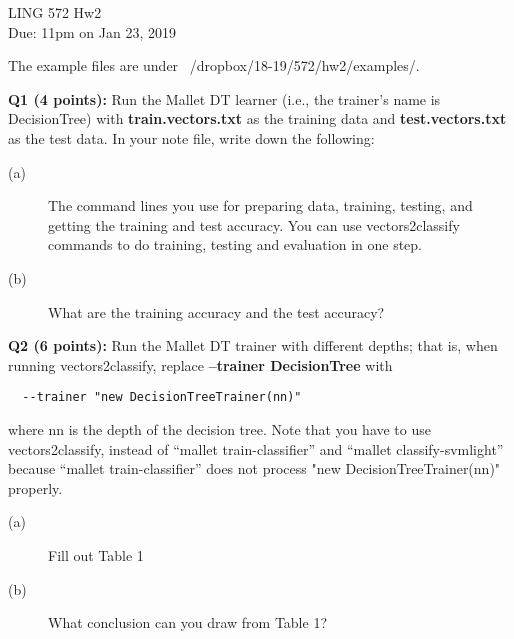 \documentclass[11pt]{article}
\begin{document}
\begin{center}
\LARGE
LING 572 Hw2\\
Due: 11pm on Jan 23, 2019\\
\vspace{0.3in}
\end{center}


The example files are under ~/dropbox/18-19/572/hw2/examples/.

\vspace{0.3 in}
\hspace{-0.3in}
{\bf Q1 (4 points):} Run the Mallet DT learner (i.e., the trainer's name
is DecisionTree) with 
{\bf train.vectors.txt} as the training data 
and {\bf test.vectors.txt} as the test data.
%
In your note file, write down the following:
\begin{description}
\item [(a)] The command lines you use for preparing data, training, testing, 
            and getting the training and test accuracy.
            You can use vectors2classify commands
            to do training, testing and evaluation in one step.

\item [(b)] What are the training accuracy and the test accuracy?
\end{description}



\vspace{0.7 in}

\hspace{-0.3in}
{\bf Q2 (6 points):} Run the Mallet DT trainer with different depths; that is,
when running vectors2classify, replace 
{\bf --trainer DecisionTree}
with
\begin{verbatim}
  --trainer "new DecisionTreeTrainer(nn)"
\end{verbatim}
where nn is the depth of the decision tree. Note that you have to 
use vectors2classify, instead of ``mallet train-classifier'' and
``mallet classify-svmlight'' because ``mallet train-classifier''
does not process "new DecisionTreeTrainer(nn)" properly.


\begin{description}
\item [(a)] Fill out Table 1
\item [(b)] What conclusion can you draw from Table 1?
\end{description}
\end{document}

